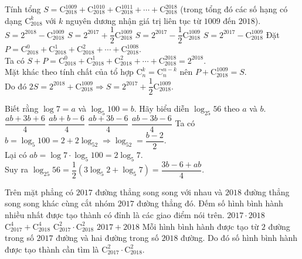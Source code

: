 \begin{ex}%
Tính tổng $S = \mathrm{C}^{1009}_{2018} + \mathrm{C}^{1010}_{2018} + \mathrm{C}^{1011}_{2018} + \cdots  + \mathrm{C}^{2018}_{2018}$ (trong tổng đó các số hạng có dạng $\mathrm{C}^{k}_{2018}$ với $k$ nguyên dương nhận giá trị liên tục từ $1009$ đến $2018$). 
\choice 
{$S = 2^{2018} - \mathrm{C}^{1009}_{2018}$}
{\True $S = 2^{2017}+\dfrac{1}{2}\mathrm{C}^{1009}_{2018}$}
{$S=2^{2017}-\dfrac{1}{2}\mathrm{C}^{1009}_{2018}$}
{$S=2^{2017}-\mathrm{C}^{1009}_{2018}$}
\loigiai
{
Đặt $P=\mathrm{C}^{0}_{2018}+\mathrm{C}^{1}_{2018}+\mathrm{C}^{2}_{2018}+\cdots + \mathrm{C}^{1008}_{2018}$.\\
Ta có $S+P =\mathrm{C}^{0}_{2018}+\mathrm{C}^{1}_{2018}+\mathrm{C}^{2}_{2018}+\cdots +\mathrm{C}^{2018}_{2018} =2^{2018}$.\\
Mặt khác theo tính chất của tổ hợp  $\mathrm{C}_n^k=\mathrm{C}_n^{n-k} $ nên
$P+\mathrm{C}_{2018}^{1009}=S$.\\
Do đó $2S= 2^{2018} +\mathrm{C}_{2018}^{1009}\Rightarrow S=2^{2017}+\dfrac{1}{2}\mathrm{C}^{1009}_{2018}.$
}
\end{ex}


\begin{ex}%
Biết rằng $\log 7 =a$ và $\log_5 100=b$. Hãy biểu diễn $\log_{25}{56}$ theo $a$ và $b$.
 \choice 
{$\dfrac{ab+3b+6}{4}$}
{$\dfrac{ab+b-6}{4}$}
{\True$\dfrac{ab+3b-6}{4}$}
{$\dfrac{ab-3b-6}{4}$}
\loigiai
{
Ta có $b=\log_{5}100 =2+2\log_52\Rightarrow \log_52 =\dfrac{b-2}{2}$.\\
Lại có $ab =\log 7 \cdot \log_5 100 = 2\log_5 7$.\\
Suy ra $\log_{25}56 =\dfrac{1}{2}\left ( 3\log_5 2 +\log_5 7\right ) = \dfrac{3b-6+ab}{4}$.
}
\end{ex}


\begin{ex}%
Trên mặt phẳng có $2017$ đường thẳng song song với nhau và $2018$ đường thẳng song song khác cùng cắt nhóm $2017$ đường thẳng đó. Đếm số hình bình hành nhiều nhất được tạo thành có đỉnh là các giao điểm nói trên. \choice 
{$2017 \cdot 2018$}
{$\mathrm{C}_{2017}^{4}+\mathrm{C}_{2018}^{4}$}
{\True $\mathrm{C}_{2017}^{2} \cdot \mathrm{C}_{2018}^{2}$}
{$2017+2018$}
\loigiai
{
Mỗi hình bình hành được tạo từ $2$ đường trong số $2017$ đường và hai đường trong số $2018$ đường. Do đó số hình bình hành được tạo thành cần tìm là $\mathrm{C}_{2017}^{2} \cdot \mathrm{C}_{2018}^{2}$.
}
\end{ex}


